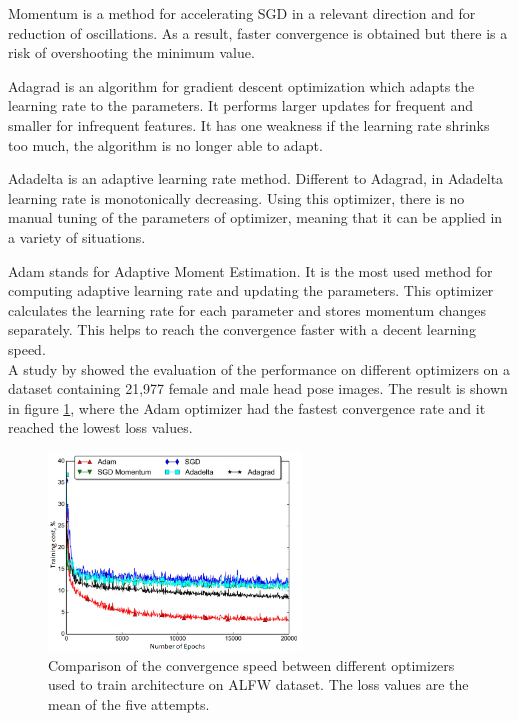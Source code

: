 \noindent
Momentum is a method for accelerating SGD in a relevant direction and for reduction of oscillations. As a result, faster convergence is obtained but there is a risk of overshooting the minimum value.\citep{Ruder2016, Qian1999}

\noindent
Adagrad is an algorithm for gradient descent optimization which adapts the learning rate to the parameters. It performs larger updates for frequent and smaller for infrequent features. It has one weakness if the learning rate shrinks too much, the algorithm is no longer able to adapt.\citep{Ruder2016}

\noindent
Adadelta is an adaptive learning rate method. Different to Adagrad, in Adadelta learning rate is monotonically decreasing. Using this optimizer, there is no manual tuning of the parameters of optimizer, meaning that it can be applied in a variety of situations.\citep{Ruder2016}

\noindent
Adam stands for Adaptive Moment Estimation. It is the most used method for computing adaptive learning rate and updating the parameters.  This optimizer calculates the learning rate for each parameter and stores momentum changes separately. This helps to reach the convergence faster with a decent learning speed.\citep{Kingma2015}\\

\noindent
A study by \citeauthor{Patacchiola2017} \citep{Patacchiola2017} showed the evaluation of the performance on different optimizers on a dataset containing 21,977 female and male head pose images. The result is shown in figure \ref{fig:Graphofyrainingcost}, where the Adam optimizer had the fastest convergence rate and it reached the lowest loss values. 

\begin{figure} [H]
\centering
\includegraphics[width=0.6\textwidth]{figures/Graphofyrainingcost}
\caption{Comparison of the convergence speed between different optimizers used to train architecture on ALFW dataset. The loss values are the mean of the five attempts.\citep{Patacchiola2017}}
\label{fig:Graphofyrainingcost}  
\end{figure}



